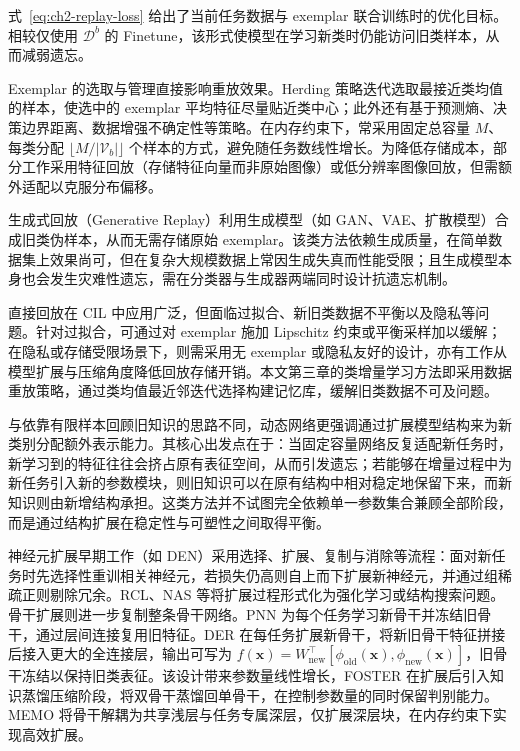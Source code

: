 式~\eqref{eq:ch2-replay-loss} 给出了当前任务数据与 exemplar 联合训练时的优化目标。相较仅使用 $\mathcal{D}^b$ 的 Finetune，该形式使模型在学习新类时仍能访问旧类样本，从而减弱遗忘。

Exemplar 的选取与管理直接影响重放效果。Herding 策略迭代选取最接近类均值的样本，使选中的 exemplar 平均特征尽量贴近类中心；此外还有基于预测熵、决策边界距离、数据增强不确定性等策略。在内存约束下，常采用固定总容量 $M$、每类分配 $\lfloor M / |\mathcal{V}_b| \rfloor$ 个样本的方式，避免随任务数线性增长\cite{zhou2024cil}。为降低存储成本，部分工作采用特征回放（存储特征向量而非原始图像）或低分辨率图像回放，但需额外适配以克服分布偏移。

生成式回放（Generative Replay）利用生成模型（如 GAN、VAE、扩散模型）合成旧类伪样本，从而无需存储原始 exemplar。该类方法依赖生成质量，在简单数据集上效果尚可，但在复杂大规模数据上常因生成失真而性能受限；且生成模型本身也会发生灾难性遗忘，需在分类器与生成器两端同时设计抗遗忘机制\cite{zhou2024cil}。

直接回放在 CIL 中应用广泛，但面临过拟合、新旧类数据不平衡以及隐私等问题。针对过拟合，可通过对 exemplar 施加 Lipschitz 约束或平衡采样加以缓解；在隐私或存储受限场景下，则需采用无 exemplar 或隐私友好的设计，亦有工作从模型扩展与压缩角度降低回放存储开销\cite{zhou2023memo}。本文第三章的类增量学习方法即采用数据重放策略，通过类均值最近邻迭代选择构建记忆库，缓解旧类数据不可及问题。


与依靠有限样本回顾旧知识的思路不同，动态网络更强调通过扩展模型结构来为新类别分配额外表示能力。其核心出发点在于：当固定容量网络反复适配新任务时，新学习到的特征往往会挤占原有表征空间，从而引发遗忘；若能够在增量过程中为新任务引入新的参数模块，则旧知识可以在原有结构中相对稳定地保留下来，而新知识则由新增结构承担。这类方法并不试图完全依赖单一参数集合兼顾全部阶段，而是通过结构扩展在稳定性与可塑性之间取得平衡\cite{zhou2024cil}。

神经元扩展早期工作（如 DEN\cite{yoon2018den}）采用选择、扩展、复制与消除等流程：面对新任务时先选择性重训相关神经元，若损失仍高则自上而下扩展新神经元，并通过组稀疏正则剔除冗余。RCL、NAS 等将扩展过程形式化为强化学习或结构搜索问题。骨干扩展则进一步复制整条骨干网络。PNN\cite{rusu2016pnn} 为每个任务学习新骨干并冻结旧骨干，通过层间连接复用旧特征。DER\cite{yan2021der} 在每任务扩展新骨干，将新旧骨干特征拼接后接入更大的全连接层，输出可写为 $f(\mathbf{x}) = W_{\mathrm{new}}^\top [\phi_{\mathrm{old}}(\mathbf{x}), \phi_{\mathrm{new}}(\mathbf{x})]$，旧骨干冻结以保持旧类表征。该设计带来参数量线性增长，FOSTER 在扩展后引入知识蒸馏压缩阶段，将双骨干蒸馏回单骨干，在控制参数量的同时保留判别能力\cite{wang2022foster}。MEMO\cite{zhou2023memo} 将骨干解耦为共享浅层与任务专属深层，仅扩展深层块，在内存约束下实现高效扩展。

